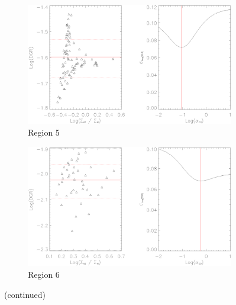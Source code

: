 \begin{figure}
  \ContinuedFloat
  \begin{subfigure}[t]{1\textwidth}
    \centering
    \includegraphics[width=1.\textwidth]{dgr_imgs/region_5_aco_output_10.eps}
    \caption{Region 5}
  \end{subfigure}

  \begin{subfigure}[t]{1\textwidth}
    \centering
    \includegraphics[width=1.\textwidth]{dgr_imgs/region_6_aco_output_10.eps}
    \caption{Region 6}
  \end{subfigure}
   \caption{(continued)}
   \label{fig:dgr_co10}
\end{figure}

